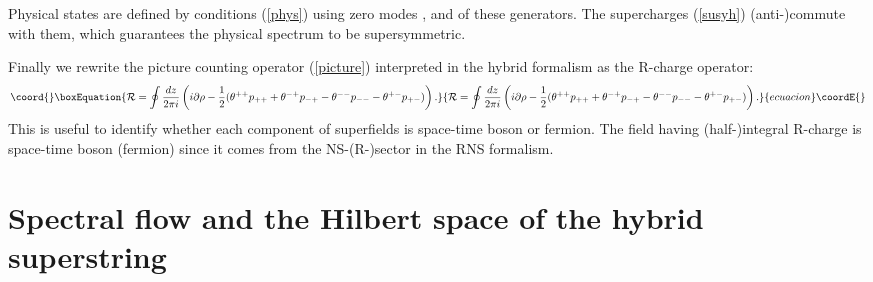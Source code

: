 \documentclass[a4paper,seceq,preprint]{ptptex}
\providecommand{\dz}{\frac{dz}{2\pi i}}
\begin{document}
Physical states are defined by conditions (\ref{phys}) 
using zero modes \coordHE{}, \coordHE{} and \coordHE{} of
these generators.
The supercharges (\ref{susyh}) (anti-)commute with them,
which guarantees the physical spectrum to be supersymmetric.

Finally we rewrite the picture counting operator 
(\ref{picture}) interpreted in the hybrid formalism 
as the R-charge operator:
\begin{equation}\coord{}\boxEquation{
 {\cal R}=\oint\dz\left(
i\partial\rho-\frac{1}{2}(
\theta^{++}p_{++}+\theta^{-+}p_{-+}-
\theta^{--}p_{--}-\theta^{+-}p_{+-})\right).\label{Rch}
}{
 {\cal R}=\oint\dz\left(
i\partial\rho-\frac{1}{2}(
\theta^{++}p_{++}+\theta^{-+}p_{-+}-
\theta^{--}p_{--}-\theta^{+-}p_{+-})\right).}{ecuacion}\coordE{}\end{equation}
This is useful to identify whether each component of superfields
is space-time boson or fermion. The field having
(half-)integral R-charge is space-time boson (fermion) since
it comes from the NS-(R-)sector in the RNS formalism.

\section{Spectral flow and the Hilbert space of 
the hybrid superstring}\label{string}
\end{document}
